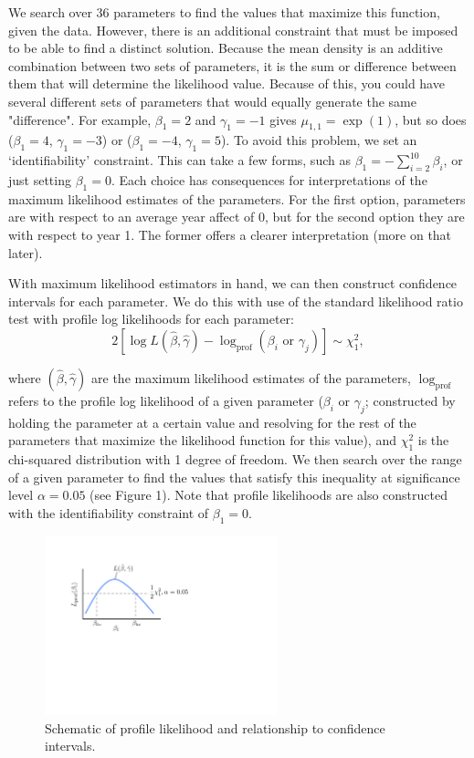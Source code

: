 \documentclass[11pt]{article}
\begin{document}
We search over 36 parameters to find the values that maximize this function, given the data. However, there is an additional constraint that must be imposed to be able to find a distinct solution. Because the mean density is an additive combination between two sets of parameters, it is the sum or difference between them that will determine the likelihood value. Because of this, you could have several different sets of parameters that would equally generate the same "difference". For example, $\beta_1 = 2$ and $\gamma_1= -1$ gives $\mu_{1,1} = \exp(1)$, but so does ($\beta_1 = 4$, $\gamma_1= -3$) or ($\beta_1 = -4$, $\gamma_1= 5$). To avoid this problem, we set an `identifiability' constraint. This can take a few forms, such as $\beta_1 = - \sum_{i=2}^{10}\beta_i$, or just setting $\beta_1 =0$. Each choice has consequences for interpretations of the maximum likelihood estimates of the parameters. For the first option, parameters are with respect to an average year affect of 0, but for the second option they are with respect to year 1. The former offers a clearer interpretation (more on that later). 

With maximum likelihood estimators in hand, we can then construct confidence intervals for each parameter. We do this with use of the standard likelihood ratio test with profile log likelihoods for each parameter:
\[
2\left[ \log L(\hat{\beta},\hat{\gamma}) - \log_{\text{prof}}(\beta_i \text{ or } \gamma_j) \right] \sim \chi^2_1,
\]

\noindent where $(\hat{\beta},\hat{\gamma})$ are the maximum likelihood estimates of the parameters, $\log_{\text{prof}}$ refers to the profile log likelihood of a given parameter ($\beta_i \text{ or } \gamma_j$; constructed by holding the parameter at a certain value and resolving for the rest of the parameters that maximize the likelihood function for this value), and $\chi^2_1$ is the chi-squared distribution with 1 degree of freedom. We then search over the range of a given parameter to find the values that satisfy this inequality at significance level $\alpha=0.05$ (see Figure 1). Note that profile likelihoods are also constructed with the identifiability constraint of $\beta_1 =0$.

\begin{figure}[h]
\centering
\includegraphics[width=0.6\textwidth]{logL_figure.pdf}
\caption{Schematic of profile likelihood and relationship to confidence intervals.}
\end{figure}
\end{document}
